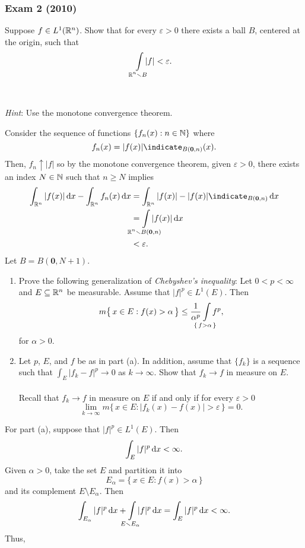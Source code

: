 \subsubsection{Exam 2 (2010)}
\setcounter{exercise}{0}
\setcounter{equation}{0}

\begin{problem}
  Suppose \(f\in L^1(\mathbb{R}^n)\). Show that for every \(\varepsilon>0\) there
  exists a ball \(B\), centered at the origin, such that
  \[
    \int\limsclap{\bbR^n\setminus B}|f|<\varepsilon.
  \]
  \\\\
  \emph{Hint}: Use the monotone convergence theorem.
\end{problem}
\begin{solution}
  Consider the sequence of functions \(\{f_n(x):n\in\mathbb{N}\}\) where
  \[
    f_n(x)=|f(x)|\indicate_{B(\mathbf{0},n)}(x).
  \]
  Then, \(f_n\uparrow |f|\) so by the monotone convergence theorem, given
  \(\varepsilon>0\), there exists an index \(N\in\mathbb{N}\) such that
  \(n\geq N\) implies
  \begin{align*}
    \int_{\bbR^n}|f(x)|\diff x-\int_{\bbR^n}f_n(x)\diff x
    &=\int_{\bbR^n}|f(x)|-|f(x)|\indicate_{B(\mathbf{0},n)}\diff x\\
    &=\int\limsclap{\bbR^n\setminus B(\mathbf{0},n)}|f(x)|\diff x\\
    &<\varepsilon.
  \end{align*}
  Let \(B=B(\mathbf{0},N+1)\).
\end{solution}
\begin{problem}
  \hfill
  \begin{enumerate}[label=(\alph*)]
  \item Prove the following generalization of \emph{Chebyshev's
      inequality}: Let \(0<p<\infty\) and \(E\subseteq\mathbb{R}^n\) be
    measurable. Assume that \(|f|^p\in L^1(E)\). Then
    \[
      m\bigl\{\,x\in E:f(x)>\alpha\,\bigr\}
      \leq\frac{1}{\alpha^p}\int\limsclap{\left\{\,f>\alpha\,\right\}}f^p,
    \]
    for \(\alpha>0\).
  \item Let \(p\), \(E\), and \(f\) be as in part (a). In addition, assume
    that \(\{f_k\}\) is a sequence such that \(\int_E|f_k-f|^p\to 0\) as
    \(k\to\infty\). Show that \(f_k\to f\) in measure on \(E\).
    \\\\
    Recall that \(f_k\to f\) in measure on \(E\) if and only if for every
    \(\varepsilon>0\)
    \[
      \lim_{k\to\infty}m\bigl\{\,x\in
      E:|f_k(x)-f(x)|>\varepsilon\,\bigr\}=0.
    \]
\end{enumerate}
\end{problem}
\begin{solution}
  For part (a), suppose that \(|f|^p\in L^1(E)\). Then
  \[
    \int_E |f|^p\mathop{}\!\mathrm{d} x<\infty.
  \]
  Given \(\alpha>0\), take the set \(E\) and partition it into
  \[
    E_\alpha=\bigl\{\,x\in E:f(x)>\alpha\,\bigr\}
  \]
  and its complement \(E\setminus E_\alpha\). Then
  \[
    \int_{E_\alpha}|f|^p\diff x
    +\int\limsclap{E\setminus E_\alpha}|f|^p\diff x=
    \int_E |f|^p\diff x<\infty.
  \]
  Thus,
\end{solution}

